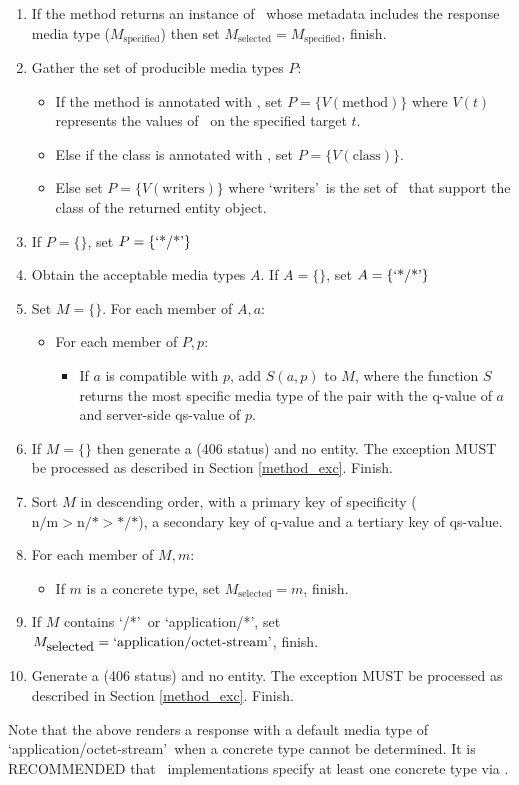 \begin{enumerate}
\item If the method returns an instance of \Response\ whose metadata includes the response media type ($M_{\mbox{specified}}$) then set $M_{\mbox{selected}} = M_{\mbox{specified}}$, finish.
\item Gather the set of producible media types $P$:
\begin{itemize}
\item If the method is annotated with \Produces, set $P = \{ V(\mbox{method}) \}$ where $V(t)$ represents the values of \Produces\ on the specified target $t$.
\item Else if the class is annotated with \Produces, set $P = \{ V(\mbox{class}) \}$.
\item Else set $P = \{ V(\mbox{writers}) \}$ where \lq writers\rq\ is the set of \MsgWrite\ that support the class of the returned entity object.
\end{itemize}

\item If $P = \{\}$, set $P = \{\mbox{\lq*/*\rq}\}$

\item Obtain the acceptable media types $A$. If $A = \{\}$, set $A = \{\mbox{\lq*/*\rq}\}$

\item Set $M=\{\}$. For each member of $A, a$:
\begin{itemize}
\item For each member of $P, p$:
\begin{itemize}
\item If $a$ is compatible with $p$, add $S(a,p)$ to $M$, where the function $S$ returns the most specific media type of the pair with the q-value of $a$ and server-side qs-value of $p$.
\end{itemize}
\end{itemize}

\item If $M = \{\}$ then generate a  (406 status) and no entity. The exception MUST be processed as described in Section \ref{method_exc}. Finish.

\item Sort $M$ in descending order, with a primary key of specificity ($\mbox{n/m} > \mbox{n/*} > \mbox{*/*}$), a secondary key of q-value and a tertiary key of qs-value.

\item For each member of $M, m$:
\begin{itemize}
\item If $m$ is a concrete type, set $M_{\mbox{selected}} = m$, finish.
\end{itemize}

\item If $M$ contains \lq*/*\rq\ or \lq application/*\rq, set $M_{\mbox{selected}} = \mbox{\lq application/octet-stream\rq}$, finish.

\item Generate a  (406 status) and no entity. The exception MUST be processed as described in Section \ref{method_exc}. Finish.
\end{enumerate}

Note that the above renders a response with a default media type of \lq application/octet-stream\rq\ when a concrete type cannot be determined. It is RECOMMENDED that \MsgWrite\ implementations specify at least one concrete type via \Produces.
